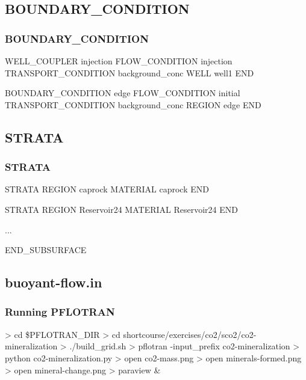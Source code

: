 \documentclass{beamer}
\newcommand\greencomment[1]{{{\color{green} #1}}}
\begin{document}
\subsection{BOUNDARY\_CONDITION}

\begin{frame}[fragile]\frametitle{BOUNDARY\_CONDITION}

\begin{semiverbatim}
WELL_COUPLER injection
  FLOW_CONDITION injection
  \greencomment{TRANSPORT_CONDITION background_conc}
  WELL well1
END

BOUNDARY_CONDITION edge
  FLOW_CONDITION initial
  \greencomment{TRANSPORT_CONDITION background_conc}
  REGION edge
END
\end{semiverbatim}

\end{frame}


\subsection{STRATA}

\begin{frame}[fragile]\frametitle{STRATA}

\begin{semiverbatim}

STRATA
  REGION caprock
  MATERIAL caprock
END

STRATA
  REGION Reservoir24
  MATERIAL Reservoir24
END

...

END_SUBSURFACE
\end{semiverbatim}

\end{frame}

\subsection{buoyant-flow.in}

\begin{frame}[fragile]\frametitle{Running PFLOTRAN}

\begin{semiverbatim}

> cd \$PFLOTRAN_DIR
> cd shortcourse/exercises/co2/sco2/co2-mineralization
> ./build_grid.sh
> pflotran -input_prefix co2-mineralization
> python co2-mineralization.py
> open co2-mass.png
> open minerals-formed.png
> open mineral-change.png
> paraview \&

\end{semiverbatim}

\end{frame}
\end{document}
